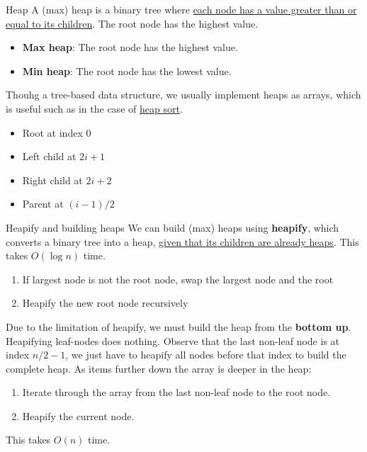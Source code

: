 \begin{definition}
    {Heap}
    A (max) heap is a binary tree where \underline{each node has a value greater than or equal to its children}. The root node has the highest value.

    \begin{itemize}
        \item \textbf{Max heap}: The root node has the highest value.
        \item \textbf{Min heap}: The root node has the lowest value.
    \end{itemize}

    Thouhg a tree-based data structure, we usually implement heaps as arrays, which is useful such as in the case of \hyperref[def:heapsort]{heap sort}.
    \begin{itemize}
        \item Root at index 0
        \item Left child at $2i + 1$
        \item Right child at $2i + 2$
        \item Parent at $(i - 1) / 2$
    \end{itemize}
\end{definition}

\begin{theorem}
    {Heapify and building heaps}
    We can build (max) heaps using \textbf{heapify}, which converts a binary tree into a heap, \underline{given that its children are already heaps}. This takes $O(\log n)$ time.
    \begin{enumerate}
        \item If largest node is not the root node, swap the largest node and the root
        \item Heapify the new root node recursively
    \end{enumerate}
    Due to the limitation of heapify, we must build the heap from the \textbf{bottom up}. Heapifying leaf-nodes does nothing. Observe that the last non-leaf node is at index $n/2 - 1$, we just have to heapify all nodes before that index to build the complete heap. As items further down the array is deeper in the heap:
    \begin{enumerate}
        \item Iterate through the array from the last non-leaf node to the root node.
        \item Heapify the current node.
    \end{enumerate}
    This takes $O(n)$ time.
\end{theorem}


